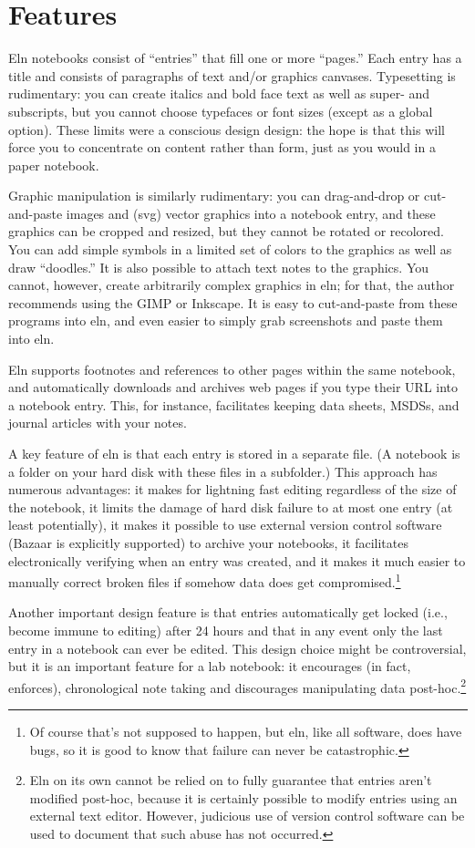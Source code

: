 \documentclass[11pt]{report}
\begin{document}
\section{Features}

Eln notebooks consist of ``entries'' that fill one or more ``pages.''
Each entry has a title and consists of paragraphs of text and/or
graphics canvases. Typesetting is rudimentary: you can create italics
and bold face text as well as super- and subscripts, but you cannot
choose typefaces or font sizes (except as a global option). These
limits were a conscious design design: the hope is that this will
force you to concentrate on content rather than form, just as you
would in a paper notebook.

Graphic manipulation is similarly rudimentary: you can drag-and-drop
or cut-and-paste images and (svg) vector graphics into a notebook
entry, and these graphics can be cropped and resized, but they cannot
be rotated or recolored. You can add simple symbols in a limited set
of colors to the graphics as well as draw ``doodles.'' It is also
possible to attach text notes to the graphics. You cannot, however,
create arbitrarily complex graphics in eln; for that, the author
recommends using the GIMP or Inkscape. It is easy to cut-and-paste
from these programs into eln, and even easier to simply grab
screenshots and paste them into eln.

Eln supports footnotes and references to other pages within the same
notebook, and automatically downloads and archives web pages if you
type their URL into a notebook entry. This, for instance, facilitates
keeping data sheets, MSDSs, and journal articles with your notes.

A key feature of eln is that each entry is stored in a separate
file. (A notebook is a folder on your hard disk with these files in a
subfolder.) This approach has numerous advantages: it makes for
lightning fast editing regardless of the size of the notebook, it
limits the damage of hard disk failure to at most one entry (at least
potentially), it makes it possible to use external version control
software (Bazaar is explicitly supported) to archive your notebooks,
it facilitates electronically verifying when an entry was created, and
it makes it much easier to manually correct broken files if somehow
data does get compromised.\footnote{Of course that's not supposed to
  happen, but eln, like all software, does have bugs, so it is good to
  know that failure can never be catastrophic.}

Another important design feature is that entries automatically get
locked (i.e., become immune to editing) after 24 hours and that in any
event only the last entry in a notebook can ever be edited. This
design choice might be controversial, but it is an important feature
for a lab notebook: it encourages (in fact, enforces), chronological
note taking and discourages manipulating data post-hoc.\footnote{Eln
 on its own cannot be relied on to fully guarantee that entries aren't
 modified post-hoc, because it is certainly possible to modify entries
 using an external text editor. However, judicious use of version
 control software can be used to document that such abuse has not
 occurred.}
\end{document}
